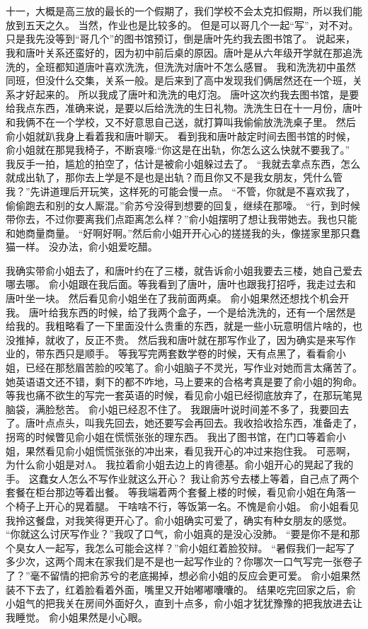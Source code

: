\chapter{}
十一，大概是高三放的最长的一个假期了，我们学校不会太克扣假期，所以我们能放到五天之久。
当然，作业也是比较多的。
但是可以哥几个一起“写”，对不对。
只是我先没等到“哥几个”的图书馆预订，倒是唐叶先约我去图书馆了。
说起来，我和唐叶关系还蛮好的，因为初中前后桌的原因。唐叶是从六年级开学就在那追洗洗的，全班都知道唐叶喜欢洗洗，但洗洗对唐叶不怎么感冒。 我和洗洗初中虽然同班，但没什么交集，关系一般。是后来到了高中发现我们俩居然还在一个班，关系才好起来的。
所以我成了唐叶和洗洗的电灯泡。
唐叶这次约我去图书馆，是要给我点东西，准确来说，是要以后给洗洗的生日礼物。洗洗生日在十一月份，唐叶和我俩不在一个学校，又不好意思自己送，就打算叫我偷偷放洗洗桌子里。
然后俞小姐就趴我身上看着我和唐叶聊天。
看到我和唐叶敲定时间去图书馆的时候，俞小姐就在那晃我椅子，不断哀嚎:“你这是在出轨，你怎么这么快就不要我了。”
我反手一拍，尴尬的拍空了，估计是被俞小姐躲过去了。
“我就去拿点东西，怎么就成出轨了，那你去上学是不是也是出轨？而且你又不是我女朋友，凭什么管我？”先讲道理后开玩笑，这样死的可能会慢一点。
“不管，你就是不喜欢我了，偷偷跑去和别的女人厮混。”俞苏兮没得到想要的回复，继续在那嚎。
“行，到时候带你去，不过你要离我们点距离怎么样？”俞小姐摆明了想让我带她去。我也只能和她商量商量。
“好啊好啊。”然后俞小姐开开心心的搓搓我的头，像搓家里那只蠢猫一样。
没办法，俞小姐爱吃醋。

我确实带俞小姐去了，和唐叶约在了三楼，就告诉俞小姐我要去三楼，她自己爱去哪去哪。
俞小姐跟在我后面。等我看到了唐叶，唐叶也跟我打招呼，我走过去和唐叶坐一块。 然后看见俞小姐坐在了我前面两桌。
俞小姐果然还想找个机会开我。
唐叶给我东西的时候，给了我两个盒子，一个是给洗洗的，还有一个居然是给我的。我粗略看了一下里面没什么贵重的东西，就是一些小玩意明信片啥的，也没推掉，就收了，反正不贵。
然后我和唐叶就在那写作业了，因为确实是来写作业的，带东西只是顺手。
等我写完两套数学卷的时候，天有点黑了，看看俞小姐，已经在那愁眉苦脸的咬笔了。俞小姐脑子不灵光，写作业对她而言太痛苦了。她英语语文还不错，剩下的都不咋地，马上要来的合格考真是要了俞小姐的狗命。
等我也痛不欲生的写完一套英语的时候，看见俞小姐已经彻底放弃了，在那玩笔晃脑袋，满脸愁苦。
俞小姐已经忍不住了。
我跟唐叶说时间差不多了，我要回去了。唐叶点点头，叫我先回去，她还要写会再回去。我收拾收拾东西，准备走了，拐弯的时候瞥见俞小姐在慌慌张张的理东西。
我出了图书馆，在门口等着俞小姐，果然看见俞小姐慌慌张张的冲出来，看见我开心的冲过来抱住我。
可恶啊，为什么俞小姐是对A。
我拉着俞小姐去边上的肯德基。俞小姐开心的晃起了我的手。
这蠢女人怎么不写作业就这么开心？
我让俞苏兮去楼上等着，自己点了两个套餐在柜台那边等着出餐。
等我端着两个套餐上楼的时候，看见俞小姐在角落一个椅子上开心的晃着腿。
干啥啥不行，等饭第一名。不愧是俞小姐。
俞小姐看见我拎这餐盘，对我笑得更开心了。俞小姐确实可爱了，确实有种女朋友的感觉。
“你就这么讨厌写作业？”我叹了口气，俞小姐真的是没心没肺。
“要是你不是和那个臭女人一起写，我怎么可能会这样？”俞小姐红着脸狡辩。
“暑假我们一起写了多少次，这两个周末在家我们是不是也一起写作业的？你哪次一口气写完一张卷子了？”毫不留情的把俞苏兮的老底揭掉，想必俞小姐的反应会更可爱。
俞小姐果然装不下去了，红着脸看着外面，嘴里又开始嘟嘟囔囔的。
结果吃完回家之后，俞小姐气的把我关在房间外面好久，直到十点多，俞小姐才犹犹豫豫的把我放进去让我睡觉。
俞小姐果然是小心眼。

